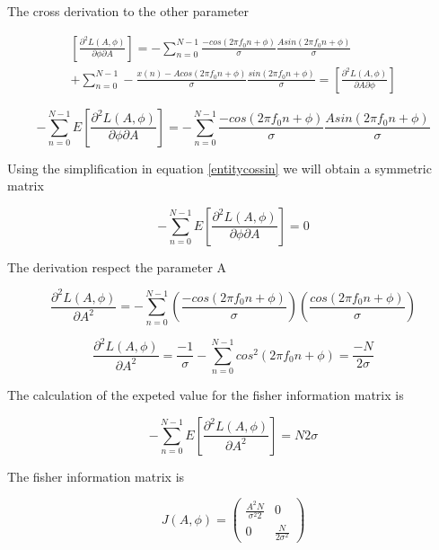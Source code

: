 \documentclass{report}
\begin{document}
The cross derivation to the other parameter

\begin{gather*}\label{key}
[\frac{\partial^2 L(A,\phi)}{\partial \phi \partial A}] = -\sum_{n=0}^{N-1} 
\frac{- cos(2\pi f_0 n +\phi)}{\sigma} \frac{Asin(2\pi f_0 n +\phi)}{\sigma} 
\\  + \sum_{n=0}^{N-1} - \frac{x(n)- Acos(2\pi f_0 n +\phi)}{\sigma} 
\frac{sin(2\pi f_0 n +\phi)}{\sigma} = [\frac{\partial^2 L(A,\phi)}{ \partial 
	A\partial \phi}] 
\end{gather*}

\begin{equation}\label{key}
-\sum_{n=0}^{N-1} E[\frac{\partial^2 L(A,\phi)}{\partial \phi \partial A}] = 
-\sum_{n=0}^{N-1} \frac{- cos(2\pi f_0 n +\phi)}{\sigma} \frac{Asin(2\pi f_0 n 
	+\phi)}{\sigma}
\end{equation} 

Using the simplification in equation \ref{entitycossin} we will obtain a 
symmetric matrix

\begin{equation}\label{key}
-\sum_{n=0}^{N-1} E[\frac{\partial^2 L(A,\phi)}{\partial \phi \partial A}] = 0
\end{equation} 

The derivation respect the parameter A

\begin{equation}
\frac{\partial^2 L(A,\phi)}{\partial A ^2} = -\sum_{n=0}^{N-1} 
(\frac{-cos(2\pi f_0 n + \phi)}{\sigma})(\frac{cos(2\pi f_0n + \phi)}{\sigma})
\end{equation}



\begin{equation}
\frac{\partial^2 L(A,\phi)}{\partial A ^2} = \frac{-1}{\sigma}-\sum_{n=0}^{N-1} 
cos^2(2\pi f_0 n + \phi) = \frac{-N}{2\sigma}
\end{equation}

The calculation of the expeted value for the fisher information matrix is

\begin{equation}
-\sum_{n=0}^{N-1} E[\frac{\partial^2 L(A,\phi)}{\partial A^2}] = {N}{2\sigma}
\end{equation} 


The fisher information matrix is 


\begin{equation}
J(A,\phi)=\begin{pmatrix}
\frac{A^2N}{\sigma^2 2} & 0 \\ 
0 & \frac{N}{2\sigma^2}
\end{pmatrix} 
\end{equation}
\end{document}
